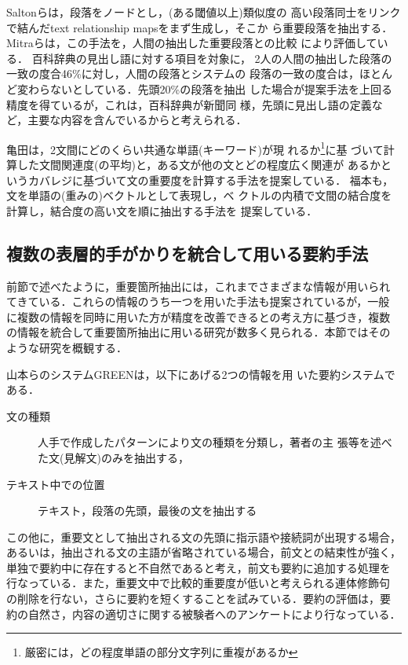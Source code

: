 Saltonら\cite{salton:96:a}は，段落をノードとし，(ある閾値以上)類似度の
高い段落同士をリンクで結んだtext relationship mapsをまず生成し，そこか
ら重要段落を抽出する．
Mitraら\cite{mitra:97:a}は，この手法を，人間の抽出した重要段落との比較
により評価している．
百科辞典の見出し語に対する項目を対象に，
2人の人間の抽出した段落の一致の度合46\%に対し，人間の段落とシステムの
段落の一致の度合は，ほとんど変わらないとしている．先頭20\%の段落を抽出
した場合が提案手法を上回る精度を得ているが，これは，百科辞典が新聞同
様，先頭に見出し語の定義など，主要な内容を含んでいるからと考えられる． 

亀田\cite{kameda:96:a}は，2文間にどのくらい共通な単語(キーワード)が現
れるか\footnote{厳密には，どの程度単語の部分文字列に重複があるか}に基
づいて計算した文間関連度(の平均)と，ある文が他の文とどの程度広く関連が
あるかというカバレジに基づいて文の重要度を計算する手法を提案している．
福本\cite{fukumoto:97:a}も，文を単語の(重みの)ベクトルとして表現し，ベ
クトルの内積で文間の結合度を計算し，結合度の高い文を順に抽出する手法を
提案している．

\subsection{複数の表層的手がかりを統合して用いる要約手法}

前節で述べたように，重要箇所抽出には，これまでさまざまな情報が用いられ
てきている．これらの情報のうち一つを用いた手法も提案されているが，一般
に複数の情報を同時に用いた方が精度を改善できるとの考え方に基づき，複数
の情報を統合して重要箇所抽出に用いる研究が数多く見られる．本節ではその
ような研究を概観する．

山本らのシステムGREEN\cite{yamamoto:95:a}は，以下にあげる2つの情報を用
いた要約システムである．
\begin{description}
\item[文の種類] 人手で作成したパターンにより文の種類を分類し，著者の主
張等を述べた文(見解文)のみを抽出する，
\item[テキスト中での位置] テキスト，段落の先頭，最後の文を抽出する
\end{description}
この他に，重要文として抽出される文の先頭に指示語や接続詞が出現する場合，
あるいは，抽出される文の主語が省略されている場合，前文との結束性が強く，
単独で要約中に存在すると不自然であると考え，前文も要約に追加する処理を
行なっている．また，重要文中で比較的重要度が低いと考えられる連体修飾句
の削除を行ない，さらに要約を短くすることを試みている．要約の評価は，要
約の自然さ，内容の適切さに関する被験者へのアンケートにより行なっている． 

